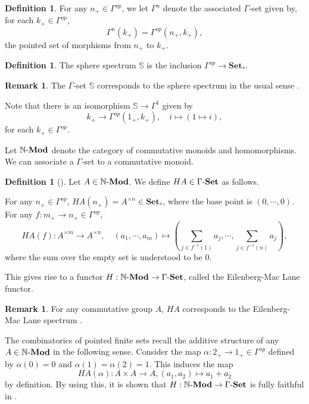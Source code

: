 \documentclass{article}
\numberwithin{equation}{section}
\theoremstyle{definition}
\newtheorem{definition}[thm]{Definition}
\newtheorem{rem}[thm]{Remark}
\begin{document}
\begin{definition}For any $n_+\in\Gamma^{op}$, we let $\Gamma^n$ denote the associated $\Gamma$-set given by, for each $k_+\in\Gamma^{op}$, 
\[\Gamma^n(k_+)=\Gamma^{op}(n_+, k_+),\]
the pointed set of morphisms from $n_+$ to $k_+$.
\end{definition}

\begin{definition}The sphere spectrum $\mathbb{S}$ is the inclusion $\Gamma^{op}\to\mathbf{Set}_*$.
\end{definition}

\begin{rem}The $\Gamma$-set $\mathbb{S}$ corresponds to the sphere spectrum in the usual sense \cite[Section 2]{DGM}.

Note that there is an isomorphism $\mathbb{S}\to\Gamma^{1}$ given by
\[k_+\to\Gamma^{op}(1_+, k_+), \quad i\mapsto (1\mapsto i),\]
for each $k_+\in\Gamma^{op}$.
\end{rem}

Let $\mathbb{N}\mathchar`-\mathbf{Mod}$ denote the category of commutative monoids and homomorphisms.
We can associate a $\Gamma$-set to a commutative monoid.

\begin{definition}[\cite{DGM}]Let $A\in\mathbb{N}\mathchar`-\mathbf{Mod}$.
We define $HA\in\Gamma \mathchar`-\mathbf{Set}$ as follows.

For any $n_+\in\Gamma^{op}$, $HA(n_+)=A^{\times n}\in\mathbf{Set}_*$, where the base point is $(0, \cdots, 0)$.
For any $f:m_+\to n_+\in\Gamma^{op}$, 
\[HA(f):A^{\times m}\to A^{\times n}, \quad (a_1, \cdots, a_m)\mapsto (\sum_{j\in f^{-1}(1)}a_j, \cdots, \sum_{j\in f^{-1}(n)}a_j),\]
where the sum over the empty set is understood to be $0$.

This gives rise to a functor $H:\mathbb{N}\mathchar`-\mathbf{Mod}\to\Gamma \mathchar`-\mathbf{Set}$, called the Eilenberg-Mac Lane functor.
\end{definition}

\begin{rem}
For any commutative group $A$, $HA$ corresponds to the Eilenberg-Mac Lane spectrum \cite[Section 2]{DGM}. 

The combinatorics of pointed finite sets recall the additive structure of any $A\in\mathbb{N}\mathchar`-\mathbf{Mod}$ in the following sense.
Consider the map $\alpha:2_+\to 1_+\in\Gamma^{op}$ defined by $\alpha(0)=0$ and $\alpha(1)=\alpha(2)=1$.
This induces the map 
\[HA(\alpha):A\times A\to A, (a_1, a_2)\mapsto a_1+a_2\]
by definition.
By using this, it is shown that $H:\mathbb{N}\mathchar`-\mathbf{Mod}\to\Gamma \mathchar`-\mathbf{Set}$ is fully faithful in \cite{CC}.
\end{rem}
\end{document}
